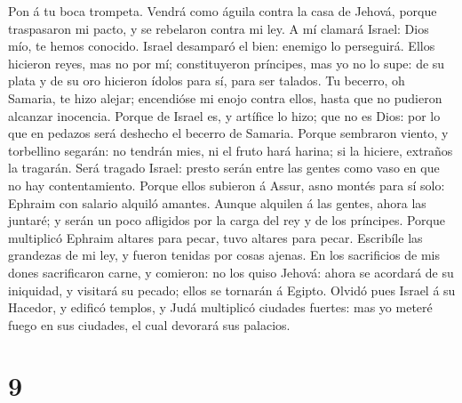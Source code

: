  Pon á tu boca trompeta. Vendrá como águila contra la casa
de Jehová, porque traspasaron mi pacto, y se rebelaron contra mi ley.
 A mí clamará Israel: Dios mío, te hemos conocido.
 Israel desamparó el bien: enemigo lo perseguirá.
 Ellos hicieron reyes, mas no por mí; constituyeron
príncipes, mas yo no lo supe: de su plata y de su oro hicieron ídolos
para sí, para ser talados.  Tu becerro, oh Samaria, te hizo
alejar; encendióse mi enojo contra ellos, hasta que no pudieron alcanzar
inocencia.  Porque de Israel es, y artífice lo hizo; que no
es Dios: por lo que en pedazos será deshecho el becerro de Samaria.
 Porque sembraron viento, y torbellino segarán: no tendrán
mies, ni el fruto hará harina; si la hiciere, extraños la tragarán.
 Será tragado Israel: presto serán entre las gentes como
vaso en que no hay contentamiento.  Porque ellos subieron á
Assur, asno montés para sí solo: Ephraim con salario alquiló amantes.
 Aunque alquilen á las gentes, ahora las juntaré; y serán
un poco afligidos por la carga del rey y de los príncipes. 
Porque multiplicó Ephraim altares para pecar, tuvo altares para pecar.
 Escribíle las grandezas de mi ley, y fueron tenidas por
cosas ajenas.  En los sacrificios de mis dones sacrificaron
carne, y comieron: no los quiso Jehová: ahora se acordará de su
iniquidad, y visitará su pecado; ellos se tornarán á Egipto.
 Olvidó pues Israel á su Hacedor, y edificó templos, y Judá
multiplicó ciudades fuertes: mas yo meteré fuego en sus ciudades, el
cual devorará sus palacios.

\hypertarget{section-8}{%
\section{9}\label{section-8}}


